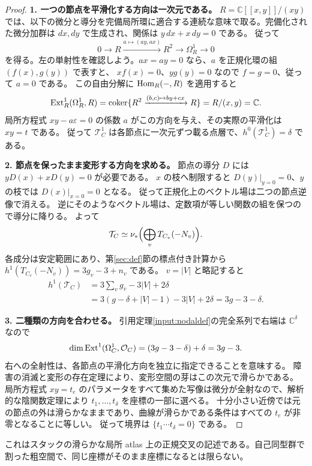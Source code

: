 \documentclass[dvipdfmx,a4paper,11pt]{article}
\theoremstyle{definition}
\newcommand{\C}{\mathbb C}\newcommand{\R}{\mathbb R}\newcommand{\Z}{\mathbb Z}\newcommand{\Q}{\mathbb Q}
\newcommand{\OO}{\mathcal O}\newcommand{\MM}{\mathcal M}\newcommand{\TT}{\mathcal T}
\newcommand{\eps}{\varepsilon}
\DeclareMathOperator{\coker}{coker}
\begin{document}
\begin{proof}
\textbf{1. 一つの節点を平滑化する方向は一次元である。}
$R=\C[[x,y]]/(xy)$ では、以下の微分と導分を完備局所環に適合する連続な意味で取る。完備化された微分加群は $dx,dy$ で生成され、関係は $y\,dx+x\,dy=0$ である。
従って
\[
0\longrightarrow R\xrightarrow{a\mapsto(ay,ax)}R^2
\longrightarrow\Omega_R^1\longrightarrow0
\]
を得る。左の単射性を確認しよう。$ax=ay=0$ なら、$a$ を正規化環の組 $(f(x),g(y))$ で表すと、
$xf(x)=0$、$yg(y)=0$ なので $f=g=0$、従って $a=0$ である。
この自由分解に $\operatorname{Hom}_R(-,R)$ を適用すると
\[
\Ext_R^1(\Omega_R^1,R)
=\coker\{R^2\xrightarrow{(b,c)\mapsto by+cx}R\}
=R/(x,y)=\C.
\]
局所方程式 $xy-a\eps=0$ の係数 $a$ がこの方向を与え、その実際の平滑化は $xy=t$ である。
従って $\mathcal T_C^1$ は各節点に一次元ずつ載る点層で、$h^0(\mathcal T_C^1)=\delta$ である。

\textbf{2. 節点を保ったまま変形する方向を求める。}
節点の導分 $D$ には $yD(x)+xD(y)=0$ が必要である。
$x$ の枝へ制限すると $D(y)|_{y=0}=0$、$y$ の枝では $D(x)|_{x=0}=0$ となる。
従って正規化上のベクトル場は二つの節点逆像で消える。
逆にそのようなベクトル場は、定数項が等しい関数の組を保つので導分に降りる。
よって
\[
\mathcal T_C\simeq\nu_*\Bigl(\bigoplus_vT_{C_v}(-N_v)\Bigr).
\]
各成分は安定範囲にあり、第\ref{sec:def}節の標点付き計算から
$h^1(T_{C_v}(-N_v))=3g_v-3+n_v$ である。
$v=|V|$ と略記すると
\begin{align*}
h^1(\mathcal T_C)
&=3\sum_vg_v-3|V|+2\delta\\
&=3(g-\delta+|V|-1)-3|V|+2\delta
=3g-3-\delta.
\end{align*}

\textbf{3. 二種類の方向を合わせる。}
引用定理\ref{input:nodaldef}の完全系列で右端は $\C^\delta$ なので
\[
\dim\Ext^1(\Omega_C^1,\OO_C)
=(3g-3-\delta)+\delta=3g-3.
\]
右への全射性は、各節点の平滑化方向を独立に指定できることを意味する。
障害の消滅と変形の存在定理により、変形空間の芽はこの次元で滑らかである。
局所方程式 $xy=t_e$ のパラメータをすべて集めた写像は微分が全射なので、解析的な陰関数定理により $t_1,\ldots,t_\delta$ を座標の一部に選べる。
十分小さい近傍では元の節点の外は滑らかなままであり、曲線が滑らかである条件はすべての $t_e$ が非零となることに等しい。
従って境界は $\{t_1\cdots t_\delta=0\}$ である。
\end{proof}
これはスタックの滑らかな局所 atlas 上の正規交叉の記述である。自己同型群で割った粗空間で、同じ座標がそのまま座標になるとは限らない。
\end{document}
